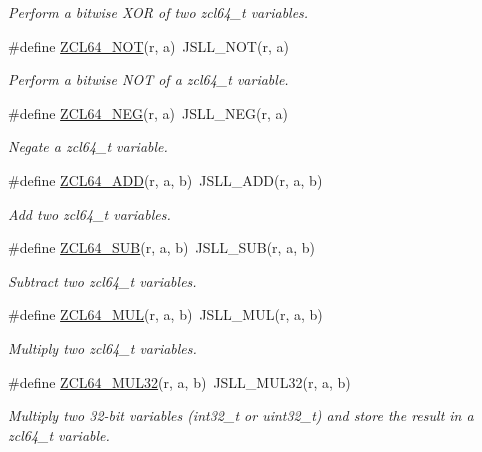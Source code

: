 \begin{DoxyCompactItemize}
\begin{DoxyCompactList}\small\item\em Perform a bitwise X\-O\-R of two zcl64\-\_\-t variables. \end{DoxyCompactList}\item 
\#define \hyperlink{group__zcl__64_ga181c9c94509aa64c1c3c3ed74d6d3c0e}{Z\-C\-L64\-\_\-\-N\-O\-T}(r, a)~J\-S\-L\-L\-\_\-\-N\-O\-T(r, a)
\begin{DoxyCompactList}\small\item\em Perform a bitwise N\-O\-T of a zcl64\-\_\-t variable. \end{DoxyCompactList}\item 
\#define \hyperlink{group__zcl__64_gab197c8668c0287b8190982177e03a257}{Z\-C\-L64\-\_\-\-N\-E\-G}(r, a)~J\-S\-L\-L\-\_\-\-N\-E\-G(r, a)
\begin{DoxyCompactList}\small\item\em Negate a zcl64\-\_\-t variable. \end{DoxyCompactList}\item 
\#define \hyperlink{group__zcl__64_gaa0b854087abee42e1bf908a133385f8d}{Z\-C\-L64\-\_\-\-A\-D\-D}(r, a, b)~J\-S\-L\-L\-\_\-\-A\-D\-D(r, a, b)
\begin{DoxyCompactList}\small\item\em Add two zcl64\-\_\-t variables. \end{DoxyCompactList}\item 
\#define \hyperlink{group__zcl__64_ga949d0b35ec1e4bf3a9e8a422b0eae4e5}{Z\-C\-L64\-\_\-\-S\-U\-B}(r, a, b)~J\-S\-L\-L\-\_\-\-S\-U\-B(r, a, b)
\begin{DoxyCompactList}\small\item\em Subtract two zcl64\-\_\-t variables. \end{DoxyCompactList}\item 
\#define \hyperlink{group__zcl__64_ga3f163bcb1ecddc543b3a4f3bdbc1d413}{Z\-C\-L64\-\_\-\-M\-U\-L}(r, a, b)~J\-S\-L\-L\-\_\-\-M\-U\-L(r, a, b)
\begin{DoxyCompactList}\small\item\em Multiply two zcl64\-\_\-t variables. \end{DoxyCompactList}\item 
\#define \hyperlink{group__zcl__64_gadb0e1566e403716d94868b45bb8c63bb}{Z\-C\-L64\-\_\-\-M\-U\-L32}(r, a, b)~J\-S\-L\-L\-\_\-\-M\-U\-L32(r, a, b)
\begin{DoxyCompactList}\small\item\em Multiply two 32-\/bit variables (int32\-\_\-t or uint32\-\_\-t) and store the result in a zcl64\-\_\-t variable. \end{DoxyCompactList}\item 

\end{DoxyCompactItemize}
